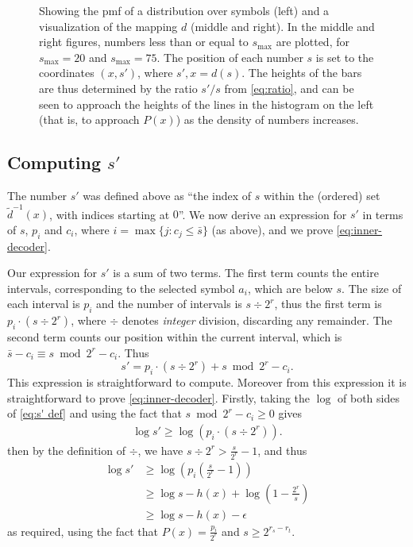 \documentclass{article}
\theoremstyle{definition}
\begin{document}
\begin{figure}[ht]
  \centering
  \drawpmf \quad {} \quad {}
  \caption{
    Showing the pmf of a distribution over symbols (left) and a visualization
    of the mapping \(d\) (middle and right). In the middle and right figures,
    numbers less than or equal to \(s_\mathrm{max}\) are plotted, for
    \(s_\mathrm{max}=20\) and \(s_\mathrm{max}=75\).  The position of each
    number \(s\) is set to the coordinates \((x, s')\), where \(s', x = d(s)\).
    The heights of the bars are thus determined by the ratio \(s'/s\) from
    \cref{eq:ratio}, and can be seen to approach the heights of the lines in
    the histogram on the left (that is, to approach \(P(x)\)) as the density of
    numbers increases.
  }\label{fig:visual-ans}
\end{figure}

\subsection{Computing \(s'\)}
The number \(s'\) was defined above as ``the index of \(s\) within the
(ordered) set \(\tilde d^{-1}(x)\), with indices starting at \(0\)''. We now
derive an expression for \(s'\) in terms of \(s\), \(p_i\) and \(c_i\), where
\(i = \max\{j: c_j \leq \bar s\}\) (as above), and we prove
\cref{eq:inner-decoder}.

Our expression for \(s'\) is a sum of two terms. The first term counts the
entire intervals, corresponding to the selected symbol \(a_i\), which are below
\(s\). The size of each interval is \(p_i\) and the number of intervals is
\(s\div 2^{r}\), thus the first term is \(p_i \cdot (s \div 2^{r})\), where
\(\div\) denotes \emph{integer} division, discarding any remainder.  The second
term counts our position within the current interval, which is \(\bar s - c_i
\equiv s\bmod 2^{r} - c_i\). Thus
\begin{equation}\label{eq:s' def}
  s' = p_i \cdot (s \div 2^{r}) + s\bmod 2^{r} - c_i.
\end{equation}
This expression is straightforward to compute. Moreover from this expression it
is straightforward to prove \cref{eq:inner-decoder}. Firstly, taking the
\(\log\) of both sides of \cref{eq:s' def} and using the fact that \(s\bmod
2^{r} - c_i \geq 0\) gives
\begin{align}
  \log s' \geq \log (p_i\cdot (s\div 2^{r})).
\end{align}
then by the definition of \(\div\), we have \(s\div 2^{r} > \frac{s}{2^{r}}
- 1\), and thus
\begin{align}
  \log s'
    &\geq \log\left(p_i\left(\frac{s}{2^{r}} -1\right)\right)\\
    &\geq \log s - h(x) + \log\left(1 - \frac{2^{r}}{s}\right)\\
    &\geq \log s - h(x) - \epsilon
\end{align}
as required, using the fact that \(P(x) = \frac{p_i}{2^{r}}\) and \(s \geq
2^{r_s - r_t}\).
\end{document}
